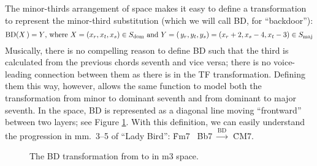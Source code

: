 The minor-thirds arrangement of \tf space makes it easy to define a
transformation to represent the minor-third substitution (which we will call
BD, for ``backdoor''):%
%
\begin{displaymath}
    \mathrm{BD}(X\,) = Y\text{, where}\ X = (x_r, x_t, x_s) \in S_{\mathrm{dom}}
    \text{ and}\
    Y = (\,y_r, y_t, y_s) = (x_r + 2, x_s - 4, x_t - 3) \in S_{\mathrm{maj}}
\end{displaymath}%
%
Musically, there is no compelling reason to define BD such that the third is
calculated from the previous chords seventh and vice versa; there is no
voice-leading connection between them as there is in the TF transformation.
Defining them this way, however, allows the same function to model both the
transformation from minor to dominant seventh and from dominant to major
seventh.\fn{mts-4} In the space, BD is represented as a diagonal line moving
``frontward'' between two layers; see Figure \ref{mts:bd-transformation}. With
this definition, we can easily understand the progression in mm.~3--5 of
``Lady Bird'': \h{Fm7} \TFarrow\ \h{Bb7} $\xrightarrow{\mathrm{BD}}$\ \h{CM7}.

\begin{figure}[tbp]
  \caption[The BD transformation in m3 space.]{The BD transformation from
    \caph{Bb7} to \caph{CM7} in m3 space.}
  \label{mts:bd-transformation}
\end{figure}


